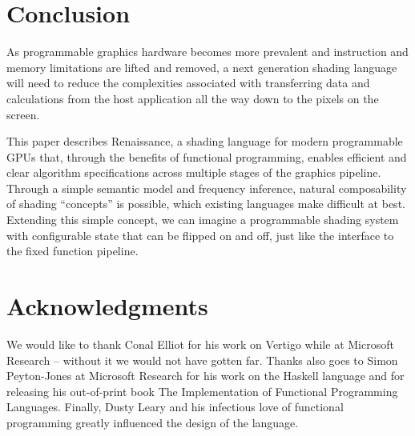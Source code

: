 \documentclass{acmsiggraph}               %
\begin{document}
\section{Conclusion}

As programmable graphics hardware becomes more prevalent and
instruction and memory limitations are lifted and removed, a next
generation shading language will need to reduce the complexities
associated with transferring data and calculations from the host
application all the way down to the pixels on the screen.

This paper describes Renaissance, a shading language for modern
programmable GPUs that, through the benefits of functional
programming, enables efficient and clear algorithm specifications
across multiple stages of the graphics pipeline.  Through a simple
semantic model and frequency inference, natural composability of
shading ``concepts'' is possible, which existing languages make
difficult at best.  Extending this simple concept, we can imagine a
programmable shading system with configurable state that can be
flipped on and off, just like the interface to the fixed function
pipeline.

\section{Acknowledgments}

We would like to thank Conal Elliot for his work on Vertigo while at
Microsoft Research -- without it we would not have gotten far.  Thanks
also goes to Simon Peyton-Jones at Microsoft Research for his work on
the Haskell language and for releasing his out-of-print book The
Implementation of Functional Programming Languages.  Finally, Dusty
Leary and his infectious love of functional programming greatly
influenced the design of the language.



\end{document}
